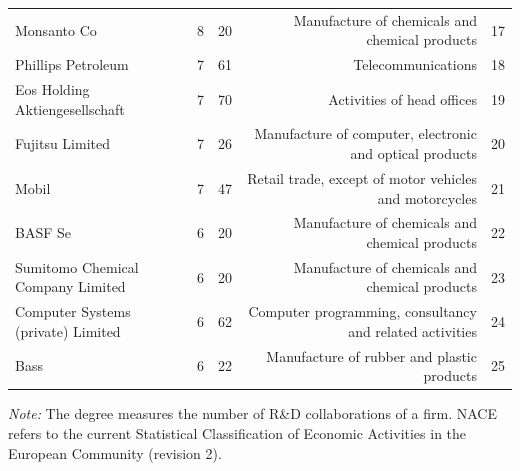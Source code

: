 \begin{table}[tbp]
{\begin{sideways}
\begin{threeparttable}
\begin{tabular}{lrrrr}
Monsanto Co & 8&   20 & Manufacture of chemicals and chemical products & 17 \\ 
Phillips Petroleum & 7&   61 & Telecommunications & 18 \\ 
Eos Holding Aktiengesellschaft & 7&   70 & Activities of head offices & 19 \\ 
Fujitsu Limited & 7&   26 & Manufacture of computer, electronic and optical products & 20 \\ 
Mobil & 7&   47 & Retail trade, except of motor vehicles and motorcycles & 21 \\ 
BASF Se & 6&   20 & Manufacture of chemicals and chemical products & 22 \\ 
Sumitomo Chemical Company Limited & 6&   20 & Manufacture of chemicals and chemical products & 23 \\ 
Computer Systems (private) Limited & 6&   62 & Computer programming, consultancy and related activities & 24 \\ 
Bass & 6&   22 & Manufacture of rubber and plastic products & 25 \\ 
\midrule
\bottomrule
    \end{tabular}%
        \begin{tablenotes}[flushleft]%
	\item \emph{Note:} The degree measures the number of R\&D collaborations of a firm. NACE refers to the current Statistical Classification of Economic Activities in the European Community (revision 2).
	\end{tablenotes}
  \label{tab:1990_deg_ranking-nace}
\end{threeparttable}
\end{sideways}
}
\end{table}

